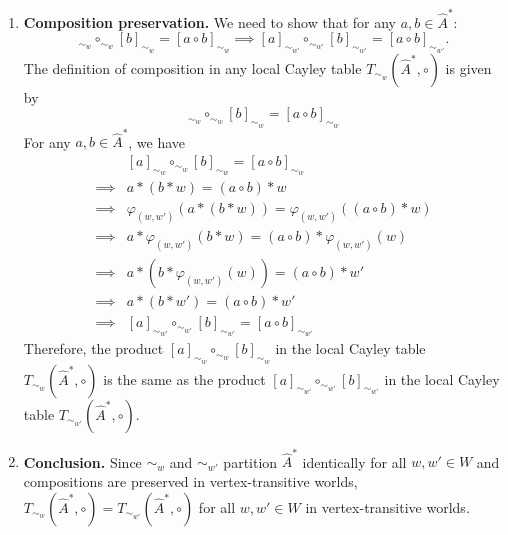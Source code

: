 \begin{proofE}
\begin{enumerate}
    \item \textbf{Composition preservation.}
    We need to show that for any $a, b \in \hat{A}^{*}$:
    \begin{equation}
        [a]_{\sim_{w}} \circ_{\sim_{w}} [b]_{\sim_{w}} = [a \circ b]_{\sim_{w}} \implies [a]_{\sim_{w'}} \circ_{\sim_{w'}} [b]_{\sim_{w'}} = [a \circ b]_{\sim_{w'}}.
    \end{equation}
    The definition of composition in any local Cayley table $T_{\sim_{w}}(\hat{A}^{*}, \circ)$ is given by
    \begin{equation}
        [a]_{\sim_{w}} \circ_{\sim_{w}} [b]_{\sim_{w}} = [a \circ b]_{\sim_{w}}
    \end{equation}
    For any $a, b \in \hat{A}^{*}$, we have
    \begin{align}
        & [a]_{\sim_{w}} \circ_{\sim_{w}} [b]_{\sim_{w}} = [a \circ b]_{\sim_{w}} \\
        \implies & a \ast (b \ast w) = (a \circ b) \ast w \\
        \implies & \varphi_{(w,w')}(a \ast (b \ast w)) = \varphi_{(w,w')}((a \circ b) \ast w) \\
        \implies & a \ast \varphi_{(w,w')}(b \ast w) = (a \circ b) \ast \varphi_{(w,w')}(w) \\
        \implies & a \ast (b \ast \varphi_{(w,w')}(w)) = (a \circ b) \ast w' \\
        \implies & a \ast (b \ast w') = (a \circ b) \ast w' \\
        \implies & [a]_{\sim_{w'}} \circ_{\sim_{w'}} [b]_{\sim_{w'}} = [a \circ b]_{\sim_{w'}}
    \end{align}
    Therefore, the product $[a]_{\sim_{w}} \circ_{\sim_{w}} [b]_{\sim_{w}}$ in the local Cayley table $T_{\sim_{w}}(\hat{A}^{*}, \circ)$ is the same as the product $[a]_{\sim_{w'}} \circ_{\sim_{w'}} [b]_{\sim_{w'}}$ in the local Cayley table $T_{\sim_{w'}}(\hat{A}^{*}, \circ)$.
    
    \item \textbf{Conclusion.}
    Since $\sim_{w}$ and $\sim_{w'}$ partition $\hat{A}^{*}$ identically for all $w, w' \in W$ and compositions are preserved in vertex-transitive worlds, $T_{\sim_{w}}(\hat{A}^{*}, \circ) = T_{\sim_{w'}}(\hat{A}^{*}, \circ)$ for all $w, w' \in W$ in vertex-transitive worlds.
\end{enumerate}
\end{proofE}



